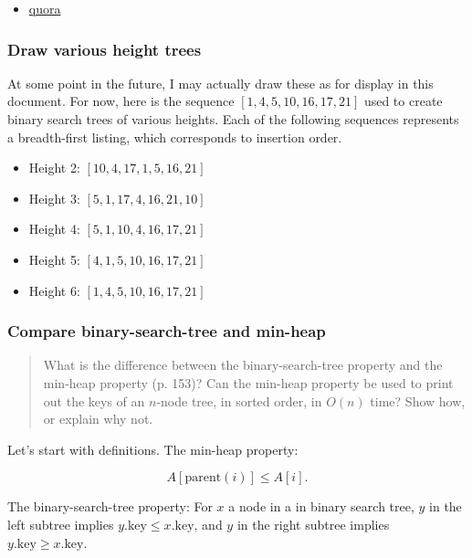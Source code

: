 \documentclass{article}
\begin{document}
\begin{itemize}
  \item \href{https://www.quora.com/What-are-some-practical-applications-of-binary-trees/answer/Az-Na?__nsrc__=4&__snid3__=1020331524}{quora}
\end{itemize}

\subsubsection{Draw various height trees}

At some point in the future, I may actually draw these as for
display in this document. For now, here is the sequence
$[1, 4, 5, 10, 16, 17, 21]$ used to create binary search trees
of various heights. Each of the following sequences represents
a breadth-first listing, which corresponds to insertion order.

\begin{itemize}
  \item Height 2: $[10, 4, 17, 1, 5, 16, 21]$
  \item Height 3: $[5, 1, 17, 4, 16, 21, 10]$
  \item Height 4: $[5, 1, 10, 4, 16, 17, 21]$
  \item Height 5: $[4, 1, 5, 10, 16, 17, 21]$
  \item Height 6: $[1, 4, 5, 10, 16, 17, 21]$
\end{itemize}

\subsubsection{Compare binary-search-tree and min-heap}

\begin{quote}
  What is the difference between the binary-search-tree property and the min-heap
  property (p. 153)? Can the min-heap property be used to print out the keys of
  an $n$-node tree, in sorted order, in $O(n)$ time?  Show how, or explain why
  not.
\end{quote}

Let's start with definitions.
The min-heap property:

\begin{equation}
  A[\mathrm{parent}(i)] \leq A[i].
\end{equation}

The binary-search-tree property: For $x$ a node in a in binary search tree,
$y$ in the left subtree implies $y.\mathrm{key} \leq x.\mathrm{key}$, and
$y$ in the right subtree implies $y.\mathrm{key} \geq x.\mathrm{key}$.
\end{document}
